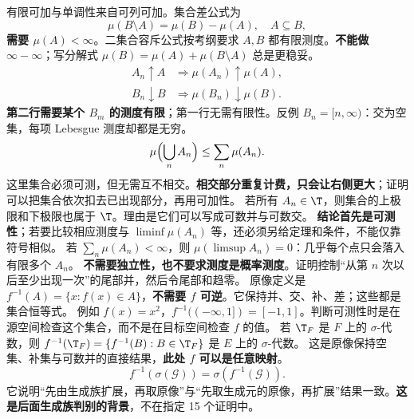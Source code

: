 有限可加与单调性来自可列可加。集合差公式为
\[
\mu(B\setminus A)=\mu(B)-\mu(A),\quad A\subseteq B,
\]
\textbf{需要 $\mu(A)<\infty$}。二集合容斥公式按考纲要求 $A,B$ 都有限测度。\textbf{不能做 $\infty-\infty$}；写分解式 $\mu(B)=\mu(A)+\mu(B\setminus A)$ 总是更稳妥。
\[
\begin{aligned}
A_n\uparrow A&\Rightarrow\mu(A_n)\uparrow\mu(A),\\
B_n\downarrow B&\Rightarrow\mu(B_n)\downarrow\mu(B).
\end{aligned}
\]
\textbf{第二行需要某个 $B_m$ 的测度有限}；第一行无需有限性。反例 $B_n=[n,\infty)$：交为空集，每项 Lebesgue 测度却都是无穷。
\[
\mu\Bigl(\bigcup_n A_n\Bigr)\le\sum_n\mu(A_n).
\]
这里集合必须可测，但无需互不相交。\textbf{相交部分重复计费，只会让右侧更大}；证明可以把集合依次扣去已出现部分，再用可加性。
若所有 $A_n\in\T$，则集合的上极限和下极限也属于 $\T$。理由是它们可以写成可数并与可数交。
\textbf{结论首先是可测性}；若要比较相应测度与 $\liminf\mu(A_n)$ 等，还必须另给定理和条件，不能仅靠符号相似。
若 $\sum_n\mu(A_n)<\infty$，则 $\mu(\limsup A_n)=0$：几乎每个点只会落入有限多个 $A_n$。
\textbf{不需要独立性，也不要求测度是概率测度}。证明控制“从第 $n$ 次以后至少出现一次”的尾部并，然后令尾部和趋零。
原像定义是 $f^{-1}(A)=\{x:f(x)\in A\}$，\textbf{不需要 $f$ 可逆}。它保持并、交、补、差；这些都是集合恒等式。
例如 $f(x)=x^2$，$f^{-1}((-\infty,1])=[-1,1]$。判断可测性时是在源空间检查这个集合，而不是在目标空间检查 $f$ 的值。
若 $\T_F$ 是 $F$ 上的 $\sigma$-代数，则 $f^{-1}(\T_F)=\{f^{-1}(B):B\in\T_F\}$ 是 $E$ 上的 $\sigma$-代数。
这是原像保持空集、补集与可数并的直接结果，\textbf{此处 $f$ 可以是任意映射}。
\[
f^{-1}(\sigma(\mathcal G))=\sigma(f^{-1}(\mathcal G)).
\]
它说明“先由生成族扩展，再取原像”与“先取生成元的原像，再扩展”结果一致。\textbf{这是后面生成族判别的背景}，不在指定 15 个证明中。
